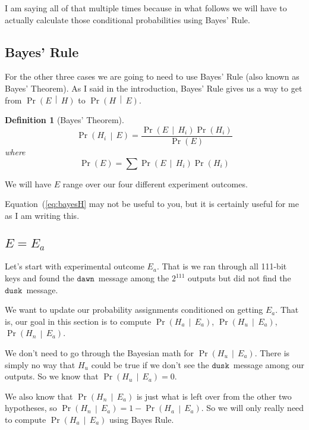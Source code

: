 \documentclass[11pt]{article}
\newcommand{\prob}[1]{\ensuremath{\operatorname{Pr}\left( #1 \right)}}
\newcommand{\condprob}[2]{\prob{#1\, \middle|\, #2}}
\newtheorem{definition}{Definition}
\newcommand\mdusk{\ensuremath{\mathtt{dusk}}}
\newcommand\mdawn{\ensuremath{\mathtt{dawn}}}
\begin{document}
I am saying all of that multiple times because in what follows
we will have to actually calculate those conditional probabilities using Bayes' Rule.

\subsection{Bayes' Rule}

For the other three cases we are going to need to use Bayes' Rule (also known as Bayes' Theorem).
As I said in the introduction, Bayes' Rule gives us a way to get from
\condprob{E}{H} to \condprob{H}{E}. 

\begin{definition}[Bayes' Theorem]\label{def:bayes}
\begin{equation}\label{eq:bayesH}
    \condprob{H_i}{E} = \frac{\condprob{E}{H_i}\prob{H_i}}{\prob{E}}
\end{equation}
where
\begin{equation}\label{eq:ProbE}
    \prob{E} = \sum \condprob{E}{H_i}\prob{H_i}
\end{equation}
\end{definition}

We will have $E$ range over our four different experiment outcomes.

Equation~(\ref{eq:bayesH} may not be useful to you, but it is certainly useful for me as I am writing this.

\subsection{\(E = E_a\)}

Let's start with experimental outcome $E_a$. That is we ran through all 111-bit keys and found the \mdawn\ message among the $2^{111}$ outputs but did not find the \mdusk\ message.

We want to update our probability assignments conditioned on getting $E_a$. That is, our goal in this section is to compute \condprob{H_a}{E_a}, \condprob{H_u}{E_a}, \condprob{H_n}{E_a}.

We don't need to go through the Bayesian math for \condprob{H_u}{E_a}.
There is simply no way that $H_u$ could be true if we don't see the \mdusk\ message among our outputs. So we know that $\condprob{H_u}{E_a} = 0$.

We also know that \condprob{H_n}{E_a} is just what is left over from the other two hypotheses, so $\condprob{H_n}{E_a} = 1 - \condprob{H_a}{E_a}$.
So we will only really need to compute \condprob{H_a}{E_a} using Bayes Rule.
\end{document}
